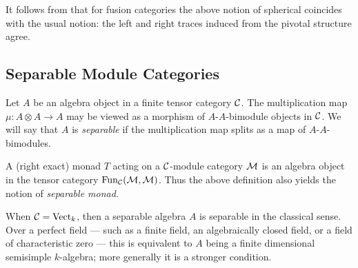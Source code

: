 \documentclass{amsart}
\begin{document}
\begin{remark}
	It follows from \cite[Cor. 7.4]{MR2097289} that for fusion categories the above notion of spherical coincides with the usual notion: the left and right traces induced from the pivotal structure agree.
\end{remark}

 

\subsection{Separable Module Categories} \label{sec-tc-separable}


 


\begin{definition}
	Let $A$ be an algebra object in a finite tensor category $\mathcal C$. The multiplication map $\mu: A \otimes A \to A$ may be viewed as a morphism of $A$-$A$-bimodule objects in $\mathcal C$. We will say that $A$ is {\em separable} if the multiplication map splits as a map of $A$-$A$-bimodules. 
\end{definition}

\begin{remark}
	A (right exact) monad $T$ acting on a $\mathcal C$-module category $\mathcal M$ is an algebra object in the tensor category $\operatorname{Fun}_\mathcal C(\mathcal M, \mathcal M)$. Thus the above definition also yields the notion of {\em separable monad}. 
\end{remark}

\begin{remark}
	When $\mathcal C = \mathrm{Vect}_k$, then a separable algebra $A$ is separable in the classical sense. Over a perfect field --- such as a finite field, an algebraically closed field, or a field of characteristic zero --- this is equivalent to $A$ being a finite dimensional semisimple $k$-algebra; more generally it is a stronger condition. 
\end{remark}
\end{document}
